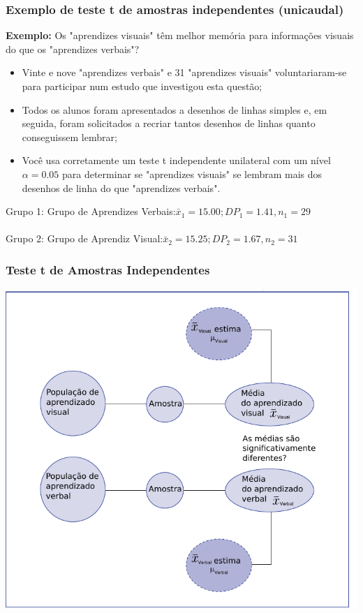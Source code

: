 \documentclass[11pt]{beamer}
\begin{document}
\begin{frame}
\frametitle{Exemplo de teste t de amostras independentes (unicaudal)}
\textbf{Exemplo:} Os "aprendizes visuais" têm melhor memória para informações visuais do que os "aprendizes verbais"?
\begin{itemize}
\item Vinte e nove "aprendizes verbais" e 31 "aprendizes visuais" voluntariaram-se para participar num estudo que investigou esta questão; 
\item Todos os alunos foram apresentados a desenhos de linhas simples e, em seguida, foram solicitados a recriar tantos desenhos de linhas quanto conseguissem lembrar;
\item Você usa corretamente um teste t independente unilateral com um nível \(\alpha=0.05\) para determinar se "aprendizes visuais" se lembram mais dos desenhos de linha do que "aprendizes verbais".
\end{itemize}
Grupo 1: Grupo de Aprendizes Verbais:\(\bar{x}_1 = 15.00; DP_1 = 1.41, n_1 = 29\)
\\~\\
Grupo 2: Grupo de Aprendiz Visual:\(\bar{x}_2 = 15.25; DP_2 = 1.67, n_2 = 31\)

\end{frame}

\begin{frame}
\frametitle{Teste t de Amostras Independentes}

\begin{center}\includegraphics[width=0.7\linewidth]{figs/fig10.3} \end{center}

\end{frame}
\end{document}
